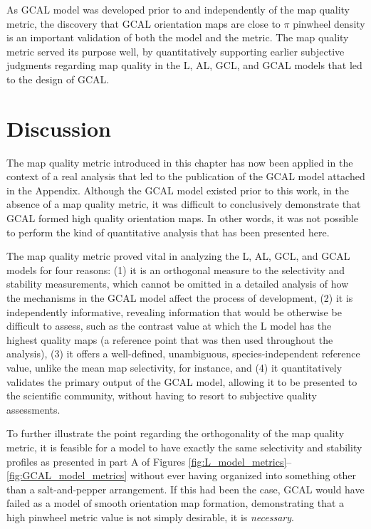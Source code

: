 \documentclass[phd,ianc,twoside]{infthesis}
\begin{document}
As GCAL model was developed prior to and independently of the map
quality metric, the discovery that GCAL orientation maps are close to
$\pi$ pinwheel density is an important validation of both the model and
the metric. The map quality metric served its purpose well, by
quantitatively supporting earlier subjective judgments regarding map
quality in the L, AL, GCL, and GCAL models that led to the design of
GCAL.

\section{Discussion}

The map quality metric introduced in this chapter has now been applied
in the context of a real analysis that led to the publication of the
GCAL model \citep{stevens_jn13} attached in the Appendix. Although the
GCAL model existed prior to this work, in the absence of a map quality
metric, it was difficult to conclusively demonstrate that GCAL formed
high quality orientation maps. In other words, it was not possible to
perform the kind of quantitative analysis that has been presented here.

The map quality metric proved vital in analyzing the L, AL, GCL, and GCAL
models for four reasons: (1) it is an orthogonal measure to the
selectivity and stability measurements, which cannot be omitted in a
detailed analysis of how the mechanisms in the GCAL model affect the process
of development, (2) it is independently informative, revealing
information that would be otherwise be difficult to assess, such as the
contrast value at which the L model has the highest quality maps (a
reference point that was then used throughout the analysis), (3) it
offers a well-defined, unambiguous, species-independent reference value,
unlike the mean map selectivity, for instance, and (4) it quantitatively
validates the primary output of the GCAL model, allowing it to be
presented to the scientific community, without having to resort to
subjective quality assessments.

To further illustrate the point regarding the orthogonality of the map
quality metric, it is feasible for a model to have exactly the same
selectivity and stability profiles as presented in part A of Figures
\ref{fig:L_model_metrics}--\ref{fig:GCAL_model_metrics} without ever
having organized into something other than a salt-and-pepper
arrangement. If this had been the case, GCAL would have failed as a
model of smooth orientation map formation, demonstrating that a high
pinwheel metric value is not simply desirable, it is \emph{necessary}.
\end{document}
